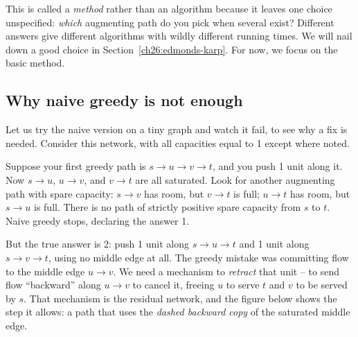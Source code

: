 This is called a \emph{method} rather than an algorithm because it leaves one
choice unspecified: \emph{which} augmenting path do you pick when several
exist? Different answers give different algorithms with wildly different running
times. We will nail down a good choice in Section~\ref{ch26:edmonds-karp}. For
now, we focus on the basic method.

\subsection{Why naive greedy is not enough}

Let us try the naive version on a tiny graph and watch it fail, to see why a
fix is needed. Consider this network, with all capacities equal
to 1 except where noted.

\begin{center}
\end{center}

Suppose your first greedy path is $s \to u \to v \to t$, and you push 1 unit
along it. Now $s \to u$, $u \to v$, and $v \to t$ are all saturated. Look for
another augmenting path with spare capacity: $s \to v$ has room, but $v \to t$
is full; $u \to t$ has room, but $s \to u$ is full. There is no path of
strictly positive spare capacity from $s$ to $t$. Naive greedy stops, declaring
the answer 1.

But the true answer is 2: push 1 unit along $s \to u \to t$ and 1 unit along
$s \to v \to t$, using no middle edge at all. The greedy mistake was committing
flow to the middle edge $u \to v$. We need a mechanism to \emph{retract} that
unit -- to send flow ``backward'' along $u \to v$ to cancel it, freeing $u$ to
serve $t$ and $v$ to be served by $s$. That mechanism is the residual network,
and the figure below shows the step it allows: a path that uses the
\emph{dashed backward copy} of the saturated middle edge.

